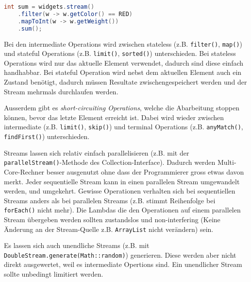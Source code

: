 \begin{lstlisting}[language=Java, caption=Stream, label=lst:stream]
int sum = widgets.stream()
	.filter(w -> w.getColor() == RED)
	.mapToInt(w -> w.getWeight())
	.sum();
\end{lstlisting}

Bei den intermediate Operations wird zwischen stateless (z.B. \verb|filter()|, \verb|map()|) und stateful Operations (z.B. \verb|limit()|, \verb|sorted()|) unterschieden. Bei stateless Operations wird nur das aktuelle Element verwendet, dadurch sind diese einfach handhabbar. Bei stateful Operation wird nebst dem aktuellen Element auch ein Zustand benötigt, dadurch müssen Resultate zwischengespeichert werden und der Stream mehrmals durchlaufen werden. 

Ausserdem gibt es \textit{short-circuiting Operations}, welche die Abarbeitung stoppen können, bevor das letzte Element erreicht ist. Dabei wird wieder zwischen intermediate (z.B. \verb|limit()|, \verb|skip()|) und terminal Operations (z.B. \verb|anyMatch()|, \verb|findFirst()|) unterschieden.

Streams lassen sich relativ einfach parallelisieren (z.B. mit der \verb|parallelStream()|-Methode des Collection-Interface). Dadurch werden Multi-Core-Rechner besser ausgenutzt ohne dass der Programmierer gross etwas davon merkt. Jeder sequentielle Stream kann in einen parallelen Stream umgewandelt werden, und umgekehrt. Gewisse Operationen verhalten sich bei sequentiellen Streams anders als bei parallelen Streams (z.B. stimmt Reihenfolge bei \verb|forEach()| nicht mehr). Die Lambdas die den Operationen auf einem parallelen Stream übergeben werden sollten zustandslos und non-interfering (Keine Änderung an der Stream-Quelle z.B. \verb|ArrayList| nicht verändern) sein.

Es lassen sich auch unendliche Streams (z.B. mit \verb|DoubleStream.generate(Math::random)|) generieren. Diese werden aber nicht direkt ausgewertet, weil es intermediate Opertions sind. Ein unendlicher Stream sollte unbedingt limitiert werden.